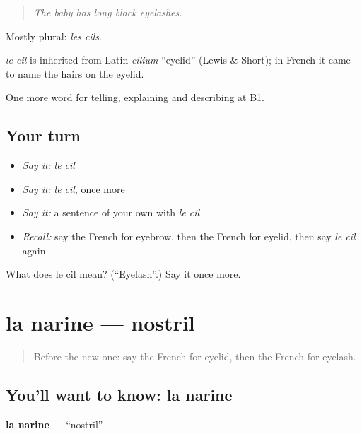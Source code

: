 \begin{quote}
\emph{The baby has long black eyelashes.}
\end{quote}

Mostly plural: \emph{les cils}.

\begin{cousinweb}
\emph{le cil} is inherited from Latin \emph{cilium} \textquotedblleft{}eyelid\textquotedblright{} (Lewis \& Short); in French it came to name the hairs on the eyelid.
\end{cousinweb}

\begin{grammarlens}[title={What you've built}]
One more word for telling, explaining and describing at B1.
\end{grammarlens}

\subsection*{Your turn}
\begin{itemize}
\raggedright
  \item \emph{Say it:} \emph{le cil}
  \item \emph{Say it:} \emph{le cil}, once more
  \item \emph{Say it:} a sentence of your own with \emph{le cil}
  \item \emph{Recall:} say the French for eyebrow, then the French for eyelid, then say \emph{le cil} again
\end{itemize}

\begin{tcolorbox}[breakable,colback=teal!4,colframe=teal!35!black,title={Before you move on}]
What does le cil mean? (\textquotedblleft{}Eyelash\textquotedblright{}.) Say it once more.
\end{tcolorbox}
\section[la narine]{la narine — nostril}

\label{lesson:FR-C478-narine}



\begin{quote}
Before the new one: say the French for eyelid, then the French for eyelash.
\end{quote}

\subsection*{You'll want to know: la narine}
\textbf{la narine} — \textquotedblleft{}nostril\textquotedblright{}.

